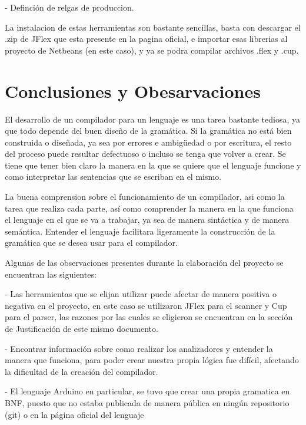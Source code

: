 \documentclass[11pt,twocolumn,spanish]{article}
\begin{document}
                    - Definción de relgas de produccion. 

La instalacion de estas herramientas son bastante sencillas, basta con descargar el .zip de JFlex que esta presente en la pagina oficial, e importar esas librerias al proyecto de Netbeans (en este caso), y ya se podra compilar archivos .flex y .cup. 

\section{Conclusiones y Obesarvaciones}
El desarrollo de un compilador para un lenguaje es una tarea bastante tediosa, ya que todo depende del buen diseño de la gramática. Si la gramática no está bien construida o diseñada, ya sea por errores e ambigüedad o por escritura, el resto del proceso puede resultar defectuoso o incluso se tenga que volver a crear. Se tiene que tener bien claro la manera en la que se quiere que el lenguaje funcione y como interpretar las sentencias que se escriban en el mismo.  

La buena comprension sobre el funcionamiento de un compilador, asi como la tarea que realiza cada parte, así como comprender la manera en la que funciona el lenguaje en el que se va a trabajar, ya sea de manera sintáctica y de manera semántica. Entender el lenguaje facilitara ligeramente la construcción de la gramática que se desea usar para el compilador.  

Algunas de las observaciones presentes durante la elaboración del proyecto se encuentran las siguientes:

        -	Las herramientas que se elijan utilizar puede afectar de manera positiva o negativa en el proyecto, en este caso se utilizaron JFlex para el scanner y Cup para el parser, las razones por las cuales se eligieron se encuentran en la sección de Justificación de este mismo documento. 
        
        -	Encontrar información sobre como realizar los analizadores y entender la manera que funciona, para poder crear nuestra propia lógica fue difícil, afectando la dificultad de la creación del compilador. 
        
        -	El lenguaje Arduino en particular, se tuvo que crear una propia gramatica en BNF, puesto que no estaba publicada de manera pública en ningún repositorio (git) o en la página oficial del lenguaje
\end{document}
